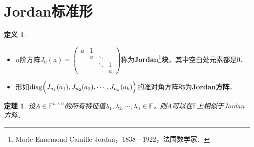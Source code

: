 \documentclass[a4paper,fontset=windows]{ctexbook}
\newtheorem{theorem}{定理}[chapter]
\theoremstyle{definition}
\newtheorem{definition}{定义}[chapter]
\DeclareMathOperator{\diag}{diag}
\begin{document}
\clearpage\section{ Jordan标准形}

\begin{definition}~
\begin{itemize}
\item $n$阶方阵$J_n(a)=\begin{pmatrix}a&1&& \\ &a&\ddots& \\ &&\ddots&1 \\&&&a\end{pmatrix}$称为{\bf Jordan\footnote{Marie Ennemond Camille Jordan，1838—1922，法国数学家．}块}，其中空白处元素都是0．
\item 形如$\diag\Bigl(J_{n_1}(a_1),J_{n_2}(a_2),\cdots,J_{n_k}(a_k)\Bigr)$的准对角方阵称为{\bf Jordan方阵}．
\end{itemize}
\end{definition}

\begin{theorem}\label{thm5.10}
设$A\in\mathbb{F}^{n\times n}$的所有特征值$\lambda_1,\lambda_2,\cdots,\lambda_n\in\mathbb{F}$，则$A$可以在$\mathbb{F}$上相似于Jordan方阵．
\end{theorem}
\end{document}
